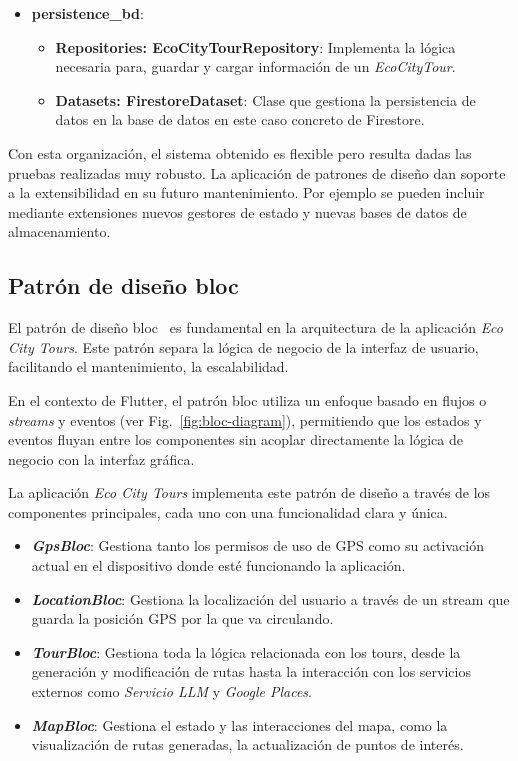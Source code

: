 \begin{itemize}
	\item \textbf{persistence\_bd}:
	\begin{itemize}
		\item \textbf{Repositories: EcoCityTourRepository}: Implementa la lógica necesaria para, guardar y cargar información de un \textit{EcoCityTour}.
		\item \textbf{Datasets: FirestoreDataset}: Clase que gestiona la persistencia de datos en la base de datos en este caso concreto de Firestore.
	\end{itemize}
\end{itemize}

Con esta organización, el sistema obtenido es flexible pero resulta dadas las pruebas realizadas muy robusto. La aplicación de patrones de diseño dan soporte a la extensibilidad en su futuro mantenimiento. Por ejemplo se pueden incluir mediante extensiones nuevos gestores de estado y nuevas bases de datos de almacenamiento.

\subsection{Patrón de diseño \acrfull{bloc}}
El patrón de diseño \acrshort{bloc}~\cite{flutter_bloc} es fundamental en la arquitectura de la aplicación \textit{Eco City Tours}. Este patrón separa la lógica de negocio de la interfaz de usuario, facilitando el mantenimiento, la escalabilidad.

En el contexto de Flutter, el patrón \acrlong{bloc} utiliza un enfoque basado en flujos o \textit{streams} y eventos (ver Fig.~\ref{fig:bloc-diagram}), permitiendo que los estados y eventos fluyan entre los componentes sin acoplar directamente la lógica de negocio con la interfaz gráfica. 

La aplicación \textit{Eco City Tours} implementa este patrón de diseño a través de los componentes principales, cada uno con una funcionalidad clara y única.
\begin{itemize}
	\item \textbf{\textit{GpsBloc}}: Gestiona tanto los permisos de uso de GPS como su activación actual en el dispositivo donde esté funcionando la aplicación.
	\item \textbf{\textit{LocationBloc}}: Gestiona la localización del usuario a través de un stream que guarda la posición GPS por la que va circulando.
	\item \textbf{\textit{TourBloc}}: Gestiona toda la lógica relacionada con los tours, desde la generación y modificación de rutas hasta la interacción con los servicios externos como \textit{Servicio LLM} y \textit{Google Places}.
	\item \textbf{\textit{MapBloc}}: Gestiona el estado y las interacciones del mapa, como la visualización de rutas generadas, la actualización de puntos de interés.
\end{itemize}

